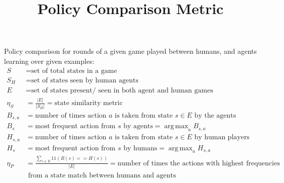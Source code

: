\documentclass[12pt]{article}
\title{Policy Comparison Metric}
\date{}
\newcommand{\unit}{1\!\!1}
\DeclareMathOperator*{\argmax}{arg\,max}
\begin{document}
\maketitle
Policy comparison for rounds of a given game played between humans, and agents learning over given examples:
\begin{align*} 
S &=\textrm{set of total states in a game}\\
S_H &= \textrm{set of states seen by human agents}\\
E &= \textrm{set of states present/ seen in both agent and human games}\\
\eta_S &= \frac{|E|}{|S_H|} = \textrm{state similarity metric} \\
B_{s,a} &= \textrm{number of times action $a$ is taken from state $s \in E$ by the agents}\\
B_{s} &= \textrm{most frequent action from $s$ by agents} = \argmax_{a} B_{s,a}\\
H_{s,a} &= \textrm{number of times action $a$ is taken from state $s \in E$ by human players}\\
H_{s} &= \textrm{most frequent action from $s$ by humans} = \argmax_{a} H_{s,a}\\
\eta_P &= \frac{\sum_{s \in E} {\unit(B(s) == H(s))}}{|E|} = \textrm{number of times the actions with highest frequencies }\\
&\textrm{ from a state match between humans and agents}
\end{align*}
\end{document}
